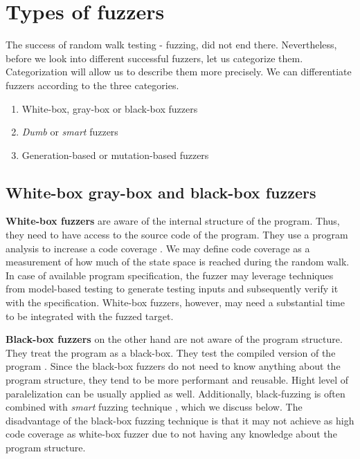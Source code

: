 \section{Types of fuzzers}
\label{sub:Types of fuzzers}
The success of random walk testing - fuzzing, did not end there. Nevertheless, before we look into different successful fuzzers, let us categorize them. Categorization will allow us to describe them more precisely. We can differentiate fuzzers according to the three categories.
\begin{enumerate}
    \item White-box, gray-box or black-box fuzzers
    \item \emph{Dumb} or \emph{smart} fuzzers
    \item Generation-based or mutation-based fuzzers
\end{enumerate}

\subsection{White-box gray-box and black-box fuzzers}
\label{ssub:White-box gray-box and black-box fuzzers}
\textbf{White-box fuzzers} are aware of the internal structure of the program. Thus, they need to have access to the source code of the program. They use a program analysis to increase a code coverage \cite{neystadt2008automated}. We may define code coverage as a measurement of how much of the state space is reached during the random walk. In case of available program specification, the fuzzer may leverage techniques from model-based testing to generate testing inputs and subsequently verify it with the specification. White-box fuzzers, however, may need a substantial time to be integrated with the fuzzed target.

\textbf{Black-box fuzzers} on the other hand are not aware of the program structure. They treat the program as a black-box. They test the compiled version of the program \cite{takanen2018fuzzing}. Since the black-box fuzzers do not need to know anything about the program structure, they tend to be more performant and reusable. Hight level of paralelization can be usually applied as well. Additionally, black-fuzzing is often combined with \emph{smart} fuzzing technique \cite{neystadt2008automated}, which we discuss below. The disadvantage of the black-box fuzzing technique is that it may not achieve as high code coverage as white-box fuzzer due to not having any knowledge about the program structure.

